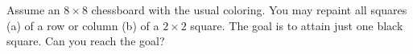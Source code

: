Assume an $8 \times 8$ chessboard with the usual coloring. You may repaint all squares (a) of a row or column (b) of a $2 \times 2$ square. The goal is to attain just one black square. Can you reach the goal?
